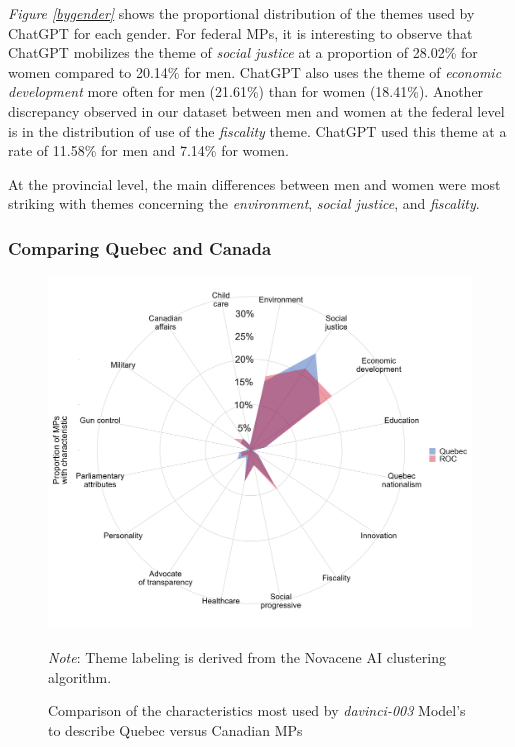 \documentclass{article}
\begin{document}
\textit{Figure \ref{bygender}} shows the proportional distribution of the themes used by ChatGPT for each gender. For federal MPs, it is interesting to observe that ChatGPT mobilizes the theme of \textit{social justice} at a proportion of 28.02\% for women compared to 20.14\% for men. ChatGPT also uses the theme of \textit{economic development} more often for men (21.61\%) than for women (18.41\%). Another discrepancy observed in our dataset between men and women at the federal level is in the distribution of use of the \textit{fiscality} theme. ChatGPT used this theme at a rate of 11.58\% for men and 7.14\% for women. \par
At the provincial level, the main differences between men and women were most striking with themes concerning the \textit{environment}, \textit{social justice}, and \textit{fiscality}.

\subsubsection{Comparing Quebec and Canada}

\begin{figure}[H]
\centering
\includegraphics[scale=0.5]{by_qc_roc.png}
\caption{Comparison of the characteristics most used by \textit{davinci-003} Model's to describe Quebec versus Canadian MPs}
\begin{minipage}{0.7\textwidth}
\footnotesize \textit{Note}: Theme labeling is derived from the Novacene AI clustering algorithm.
\end{minipage}
\label{byqcroc}
\end{figure}
\end{document}
